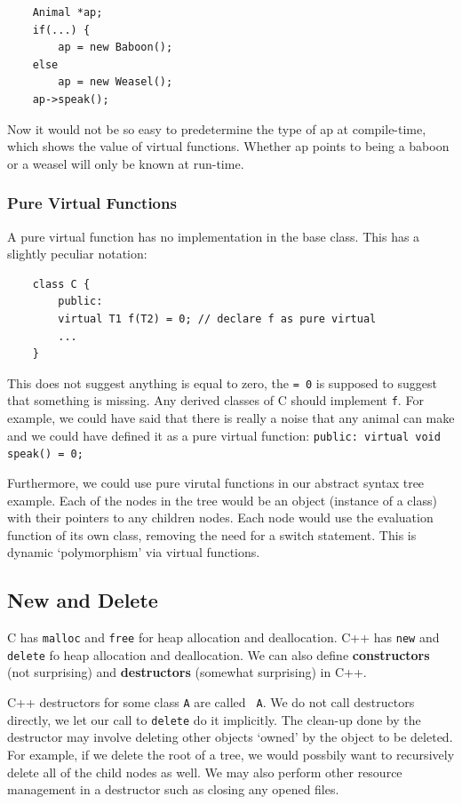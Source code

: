 \documentclass{article}
\begin{document}
	\begin{verbatim}
	Animal *ap;
	if(...) {
	    ap = new Baboon();
	else
	    ap = new Weasel();
	ap->speak();
	\end{verbatim}
	
	Now it would not be so easy to predetermine the type of ap at compile-time, which shows the value of virtual functions. Whether ap points to being a baboon or a weasel will only be known at run-time.
	
	\subsubsection{Pure Virtual Functions}
	A pure virtual function has no implementation in the base class. This has a slightly peculiar notation: 
	
	\begin{verbatim}
	class C {
	    public:
	    virtual T1 f(T2) = 0; // declare f as pure virtual
	    ...
	}
	\end{verbatim}
	
	This does not suggest anything is equal to zero, the \texttt{= 0} is supposed to suggest that something is missing. Any derived classes of C should implement \texttt{f}. For example, we could have said that there is really a noise that any animal can make and we could have defined it as a pure virtual function: \texttt{public: virtual void speak() = 0;}
	
	\par 
	Furthermore, we could use pure virutal functions in our abstract syntax tree example. Each of the nodes in the tree would be an object (instance of a class) with their pointers to any children nodes. Each node would use the evaluation function of its own class, removing the need for a switch statement. This is dynamic `polymorphism' via virtual functions.
	
	\subsection{New and Delete}
	C has \texttt{malloc} and \texttt{free} for heap allocation and deallocation. C++ has \texttt{new} and \texttt{delete} fo heap allocation and deallocation. We can also define \textbf{constructors} (not surprising) and \textbf{destructors} (somewhat surprising) in C++.
	
	\par 
	C++ destructors for some class \texttt{A} are called \texttt{~A}. We do not call destructors directly, we let our call to \texttt{delete} do it implicitly. The clean-up done by the destructor may involve deleting other objects `owned' by the object to be deleted. For example, if we delete the root of a tree, we would possbily want to recursively delete all of the child nodes as well. We may also perform other resource management in a destructor such as closing any opened files.
	
\end{document}

